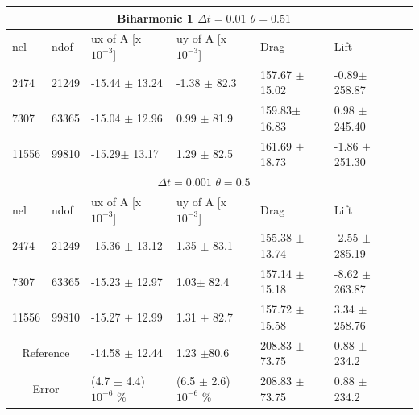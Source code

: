 \begin{table}[h!]
\centering
\label{my-label}
\begin{tabular}{ |p{1cm}||p{1cm}|p{3.2cm}|p{3.2cm}|p{2.9cm}|p{3.1cm}|p{1.2cm}|}
 \hline
  \multicolumn{6}{|c|}{Biharmonic 1 \hspace{2mm} $\Delta t = 0.01$  \hspace{2mm}  $\theta = 0.51$} \\
   \hline
nel & ndof & ux of A [x $10^{-3}$]  &uy of A [x $10^{-3}$]& Drag  & Lift \\
 \hline
 2474    & 21249  & -15.44 $\pm$  13.24 & -1.38 $\pm$  82.3   & 157.67  $\pm$  15.02 & -0.89$\pm$ 258.87 \\
 7307    & 63365  & -15.04 $\pm$ 12.96  & 0.99  $\pm$ 81.9 & 159.83$\pm$  16.83 & 0.98 $\pm$  245.40  \\
 11556   & 99810  & -15.29$\pm$ 13.17   & 1.29 $\pm$ 82.5 &  161.69 $\pm$   18.73 & -1.86 $\pm$ 251.30 \\

 \hline
  \multicolumn{6}{|c|}{$\Delta t = 0.001$  \hspace{2mm}  $\theta = 0.5$} \\
   \hline
 nel & ndof & ux of A [x $10^{-3}$]  &uy of A [x $10^{-3}$]& Drag  & Lift \\
\hline
 2474    & 21249  & -15.36 $\pm$ 13.12 &  1.35 $\pm$ 83.1& 155.38   $\pm$   13.74 & -2.55 $\pm$ 285.19 \\ 
 7307    & 63365  & -15.23 $\pm$ 12.97 & 1.03$\pm$ 82.4 & 157.14  $\pm$  15.18 & -8.62   $\pm$  263.87 \\
 11556   & 99810  &-15.27 $\pm$ 12.99 & 1.31 $\pm$ 82.7 & 157.72  $\pm$ 15.58 & 3.34    $\pm$ 258.76  \\
 \hline
  \multicolumn{2}{|c|}{Reference} & -14.58 $\pm$ 12.44   & 1.23 $\pm$80.6    & 208.83 $\pm$ 73.75 & 0.88 $\pm$ 234.2 \\
 \hline
\multicolumn{2}{|c|}{Error}  & (4.7 $\pm$ 4.4)$10^{-6}$ \% & (6.5 $\pm$ 2.6)$10^{-6}$ \%  & 208.83 $\pm$ 73.75 & 0.88 $\pm$ 234.2 \\
 \hline
\end{tabular}
\end{table}

